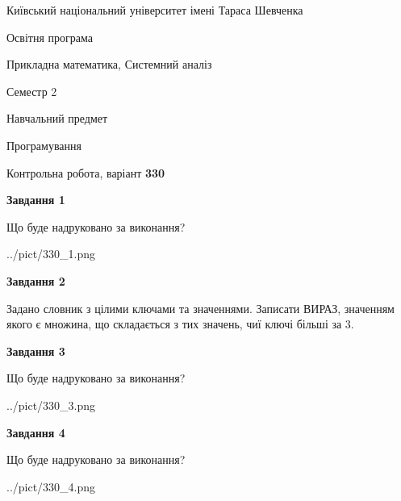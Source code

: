 \documentclass[12pt, ukrainian]{article}
\begin{document}
{{\begin {small}\par
{ \center  Київський національний університет імені Тараса Шевченка \par}
{\parbox {5 cm}{Освітня програма \hfill}{\parbox {8 cm}{Прикладна математика, Системний аналіз \hfill}}\parbox {5 cm}{\hfill Семестр 2}}\par
{\parbox {5 cm} {Навчальний предмет \hfill}\parbox {7 cm}{Програмування \hfill}\parbox {6cm}{\hfill}\par}\vspace{-7pt} \end{small}}{\center Контрольна робота, варіант  \No \textbf
{ 330 }\par}}
{
\begin {large}
{\begin {center}\textbf{Завдання 1}\end {center}}\par
Що буде надруковано за виконання?\par\par
\begin{center}
	{../pict/330_1.png}
\end{center}
\newpage

{\begin {center}\textbf{Завдання 2}\end {center}}\par
Задано словник  з цілими ключами та значеннями. Записати ВИРАЗ, значенням якого є множина, що складається  з тих значень, чиї ключі більші за 3.\par
\newpage

{\begin {center}\textbf{Завдання 3}\end {center}}\par
Що буде надруковано за виконання?\par
\begin{center}
	{../pict/330_3.png}
\end{center}
\newpage

{\begin {center}\textbf{Завдання 4}\end {center}}\par
Що буде надруковано за виконання?\par
\begin{center}
	{../pict/330_4.png}
\end{center}
\newpage


\end{large}}
\end{document}
